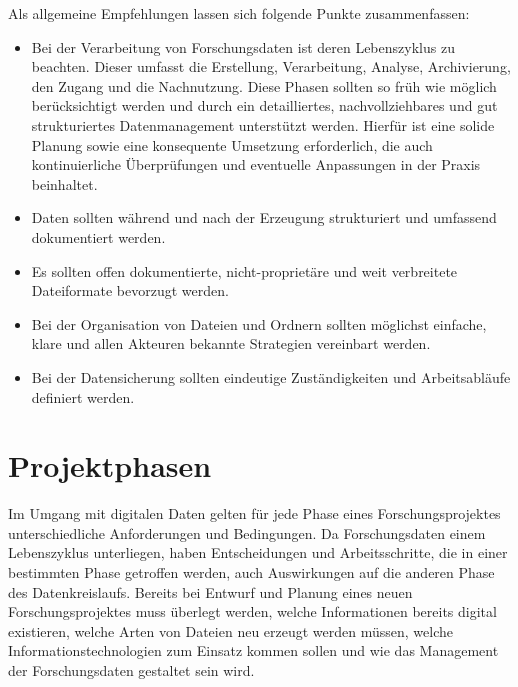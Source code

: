 \documentclass[a4paper]{report}
\begin{document}
Als allgemeine Empfehlungen lassen sich folgende Punkte zusammenfassen:
\begin{itemize}
	\item Bei der Verarbeitung von Forschungsdaten ist deren Lebenszyklus zu beachten. Dieser umfasst die Erstellung, Verarbeitung, Analyse, Archivierung, den Zugang und die Nachnutzung. Diese Phasen sollten so früh wie möglich berücksichtigt werden und durch ein detailliertes, nachvollziehbares und gut strukturiertes Datenmanagement unterstützt werden. Hierfür ist eine solide Planung sowie eine konsequente Umsetzung erforderlich, die auch kontinuierliche Überprüfungen und eventuelle Anpassungen in der Praxis beinhaltet.
	\item Daten sollten während und nach der Erzeugung strukturiert und umfassend dokumentiert werden.
	\item Es sollten offen dokumentierte, nicht-proprietäre und weit verbreitete Dateiformate bevorzugt werden.
	\item Bei der Organisation von Dateien und Ordnern sollten möglichst einfache, klare und allen Akteuren bekannte Strategien vereinbart werden.
	\item Bei der Datensicherung sollten eindeutige Zuständigkeiten und Arbeitsabläufe definiert werden. 
\end{itemize}


\chapter{Projektphasen}
	\label{projektphasen}

Im Umgang mit digitalen Daten gelten für jede Phase eines Forschungsprojektes unterschiedliche Anforderungen und Bedingungen. Da Forschungsdaten einem Lebenszyklus unterliegen, haben Entscheidungen und Arbeitsschritte, die in einer bestimmten Phase getroffen werden, auch Auswirkungen auf die anderen Phase des Datenkreislaufs. Bereits bei Entwurf und Planung eines neuen Forschungsprojektes muss überlegt werden, welche Informationen bereits digital existieren, welche Arten von Dateien neu erzeugt werden müssen, welche Informationstechnologien zum Einsatz kommen sollen und wie das Management der Forschungsdaten gestaltet sein wird. 
\end{document}
